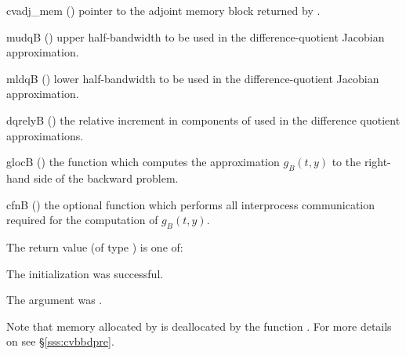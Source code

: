{
  \begin{args}
  \item[cvadj\_mem] ()
    pointer to the adjoint memory block returned by .
  \item[mudqB] ()
    upper half-bandwidth to be used in the difference-quotient Jacobian approximation.
  \item[mldqB] ()
    lower half-bandwidth to be used in the difference-quotient Jacobian approximation.
  \item[dqrelyB] ()
    the relative increment in components of  used in the difference quotient
    approximations.
  \item[glocB] ()
    the {\C} function which computes the approximation $g_B(t,y)$  to the right-hand
    side of the backward problem. 
  \item[cfnB] ()
    the optional {\C} function which performs all interprocess communication required for
    the computation of $g_B(t,y)$.
  \end{args}
}
{
  The return value  (of type ) is one of:
  \begin{args}
  \item[\Id{CV\_SUCCESS}] 
    The {\cvspgmr} initialization was successful.
  \item[\Id{CV\_ADJMEM\_NULL}]
    The  argument was .
  \end{args}
}
{}
Note that memory allocated by  is deallocated 
by the function .
For more details on {\cvbbdpre} see \S\ref{sss:cvbbdpre}.

